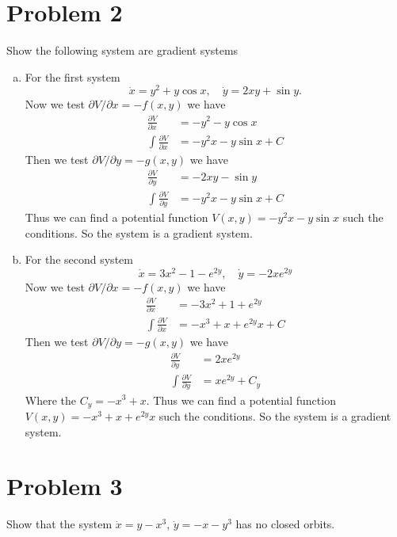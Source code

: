 \documentclass[12pt]{exam}
\begin{document}
\section*{Problem 2}
Show the following system are gradient systems

\begin{enumerate}[(a)]
	\item For the first system
	\[ \dot{x} = y^2 + y \cos x, \quad \dot{y} = 2xy + \sin y. \]
	Now we test $\partial V/ \partial x = - f(x, y )$ we have
	\begin{align*}
		\frac{\partial V}{\partial x} &= -y^2 - y \cos x \\
		\int \frac{\partial V}{\partial x}  &= -y^2 x - y \sin x + C 
	\end{align*}
	Then we test $\partial V/ \partial y = - g(x, y )$ we have
	\begin{align*}
		\frac{\partial V}{\partial y} &= -2xy - \sin y \\
		\int \frac{\partial V}{\partial y}  &= -y^2 x - y\sin x + C
	\end{align*}
	Thus we can find a potential function $V(x,y) = -y^2 x - y \sin x$ such the conditions. So the system is a gradient system.

	\item For the second system
		\[ \dot{x} = 3x^2 -1-e^{2y}, \quad \dot{y} = -2 x e^{2y} \]
		Now we test $\partial V/ \partial x = - f(x, y )$ we have
		\begin{align*}
			\frac{\partial V}{\partial x} &= -3x^2 + 1 + e^{2y} \\
			\int \frac{\partial V}{\partial x}  &= -x^3 + x + e^{2y}x + C
		\end{align*}
		Then we test $\partial V/ \partial y = - g(x, y )$ we have
		\begin{align*}
			\frac{\partial V}{\partial y} &= 2xe^{2y} \\
			\int \frac{\partial V}{\partial y}  &= xe^{2y} + C_y
		\end{align*}
		Where the $C_y = -x^3+x$. Thus we can find a potential function $V(x,y) = -x^3 + x + e^{2y}x$ such the conditions. So the system is a gradient system.
\end{enumerate}

\section*{Problem 3}
Show that the system $\dot{x} = y -x^3$, $\dot{y} = -x -y^3$ has no closed orbits.
\end{document}
